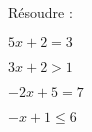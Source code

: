 \documentclass{automatisme}
\begin{document}
\begin{frame}
	Résoudre :

	\setlength{\columnseprule}{1pt}
	\begin{multicols}{4}
		$5x + 2 = 3$ \vspace*{9em}

		\columnbreak

		$3x + 2 > 1$

		\columnbreak

		$-2x + 5 = 7$

		\columnbreak

		$-x + 1 ≤ 6$
	\end{multicols}
\end{frame}
\end{document}
